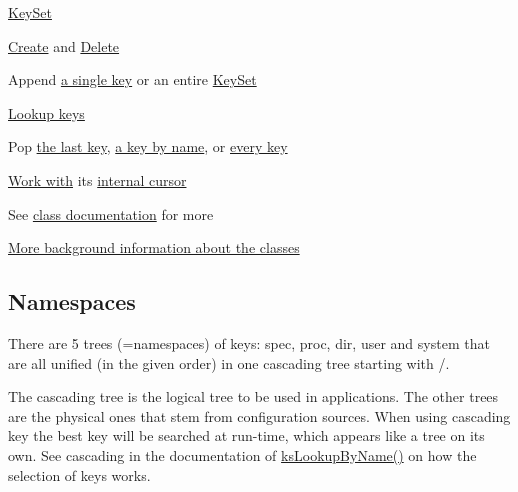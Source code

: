 \hyperlink{group__keyset}{Key\+Set}
\begin{DoxyItemize}
\item \hyperlink{group__keyset_ga671e1aaee3ae9dc13b4834a4ddbd2c3c}{Create} and \hyperlink{group__keyset_ga27e5c16473b02a422238c8d970db7ac8}{Delete}
\item Append \hyperlink{group__keyset_gaa5a1d467a4d71041edce68ea7748ce45}{a single key} or an entire \hyperlink{group__keyset_ga21eb9c3a14a604ee3a8bdc779232e7b7}{Key\+Set}
\item \hyperlink{group__keyset_gaa34fc43a081e6b01e4120daa6c112004}{Lookup keys}
\item Pop \hyperlink{group__keyset_gae42530b04defb772059de0600159cf69}{the last key}, \hyperlink{group__keyset_gaa34fc43a081e6b01e4120daa6c112004}{a key by name}, or \hyperlink{group__keyset_gaba1f1dbea191f4d7e7eb3e4296ae7d5e}{every key}
\item \hyperlink{group__keyset_ga317321c9065b5a4b3e33fe1c399bcec9}{Work with} its \hyperlink{group__keyset_ga4287b9416912c5f2ab9c195cb74fb094}{internal cursor}
\item See \hyperlink{group__keyset}{class documentation} for more
\end{DoxyItemize}

\hyperlink{doc_dev_classes_md}{More background information about the classes}

\subsection*{Namespaces}

There are 5 trees (=namespaces) of keys\+: {\ttfamily spec}, {\ttfamily proc}, {\ttfamily dir}, {\ttfamily user} and {\ttfamily system} that are all unified (in the given order) in one cascading tree starting with {\ttfamily /}.

The cascading tree is the logical tree to be used in applications. The other trees are the physical ones that stem from configuration sources. When using cascading key the best key will be searched at run-\/time, which appears like a tree on its own. See cascading in the documentation of \hyperlink{group__keyset_gad2e30fb6d4739d917c5abb2ac2f9c1a1}{ks\+Lookup\+By\+Name()} on how the selection of keys works.


